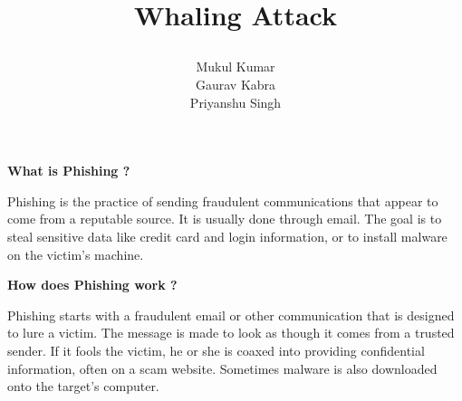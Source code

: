 \documentclass[15pt]{article}
\begin{document}
 
\title{ \begin{LARGE} \textbf{ Whaling Attack } \end{LARGE} }
\author{ Mukul Kumar \\ Gaurav Kabra \\ Priyanshu Singh }
\maketitle
 
 \begin{Large} \begin{center}
   \textbf{What is Phishing ?}
  \end{center} \end{Large} 
  
   Phishing is the practice of sending fraudulent communications that appear to come from a reputable source. It is usually done through email. The goal is to steal sensitive data like credit card and login information, or to install malware on the victim’s machine.
 
 \begin{Large} \begin{center}
   \textbf{How does Phishing work ?}
  \end{center} \end{Large}  
  
  Phishing starts with a fraudulent email or other communication that is designed to lure a victim. The message is made to look as though it comes from a trusted sender. If it fools the victim, he or she is coaxed into providing confidential information, often on a scam website. Sometimes malware is also downloaded onto the target’s computer.
  
\end{document}

